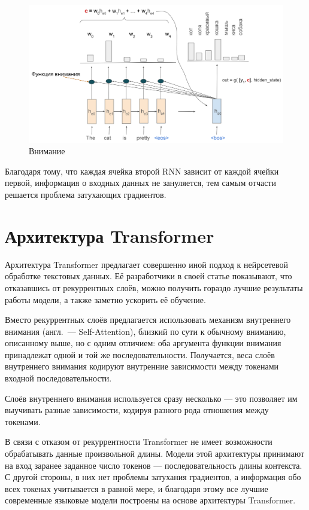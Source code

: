 \begin{figure}[h]
    \centering
    \includegraphics[width=\textwidth]{../inc/images/attention.png}
    \caption{Внимание}
    \label{fig:attention}
\end{figure}

Благодаря тому, что каждая ячейка второй RNN зависит от каждой ячейки первой, информация о входных данных не зануляется, тем самым отчасти решается проблема затухающих градиентов.

\section{Архитектура Transformer}

Архитектура Transformer предлагает совершенно иной подход к нейрсетевой обработке текстовых данных. Её разработчики в своей статье \cite{art:transformer} показывают, что отказавшись от рекуррентных слоёв, можно получить гораздо лучшие результаты работы модели, а также заметно ускорить её обучение.

Вместо рекуррентных слоёв предлагается использовать механизм внутреннего внимания (англ. --- Self-Attention), близкий по сути к обычному вниманию, описанному выше, но с одним отличием: оба аргумента функции внимания принадлежат одной и той же последовательности. Получается, веса слоёв внутреннего внимания кодируют внутренние зависимости между токенами входной последовательности.

Слоёв внутреннего внимания используется сразу несколько --- это позволяет им выучивать разные зависимости, кодируя разного рода отношения между токенами.

В связи с отказом от рекуррентности Transformer не имеет возможности обрабатывать данные произвольной длины. Модели этой архитектуры принимают на вход заранее заданное число токенов --- последовательность длины контекста. С другой стороны, в них нет проблемы затухания градиентов, а информация обо всех токенах учитывается в равной мере, и благодаря этому все лучшие современные языковые модели построены на основе архитектуры Transformer.

